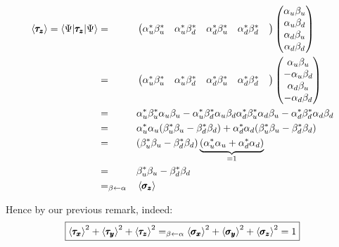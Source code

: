 \documentclass[solutions.tex]{subfiles}
\begin{document}
\begin{equation*}\begin{aligned}
	\left\langle \pmb{\tau_z} \right\rangle = \langle \Psi|\pmb{\tau_z}|\Psi\rangle
		&=&& \begin{pmatrix}
			\alpha_u^*\beta_u^* &
			\alpha_u^*\beta_d^* &
			\alpha_d^*\beta_u^* &
			\alpha_d^*\beta_d^* &
		\end{pmatrix}\begin{pmatrix}
			\alpha_u\beta_u \\
			\alpha_u\beta_d \\
			\alpha_d\beta_u \\
			\alpha_d\beta_d \\
		\end{pmatrix} \\
	~ &=&& \begin{pmatrix}
			\alpha_u^*\beta_u^* &
			\alpha_u^*\beta_d^* &
			\alpha_d^*\beta_u^* &
			\alpha_d^*\beta_d^* &
		\end{pmatrix}\begin{pmatrix}
			\alpha_u\beta_u \\
			-\alpha_u\beta_d \\
			\alpha_d\beta_u \\
			-\alpha_d\beta_d \\
		\end{pmatrix} \\
	~ &=&& \alpha_u^*\beta_u^*\alpha_u\beta_u
			-\alpha_u^*\beta_d^*\alpha_u\beta_d
			\alpha_d^*\beta_u^*\alpha_d\beta_u
			-\alpha_d^*\beta_d^*\alpha_d\beta_d  \\
	~ &=&& \alpha_u^*\alpha_u(
			\beta_u^*\beta_u - \beta_d^*\beta_d
		) + \alpha_d^*\alpha_d(
			\beta_u^*\beta_u - \beta_d^*\beta_d
		) \\
	~ &=&& (\beta_u^*\beta_u - \beta_d^*\beta_d)
		\underbrace{(\alpha_u^*\alpha_u+ \alpha_d^*\alpha_d)}_{=1} \\
	~ &=&& \beta_u^*\beta_u - \beta_d^*\beta_d \\
	~ &=_{\beta\leftarrow\alpha}&& \left\langle \pmb{\sigma_z} \right\rangle
\end{aligned}\end{equation*}

Hence by our previous remark, indeed:
\[
	\boxed{\left\langle \pmb{\tau_x} \right\rangle^2+\left\langle \pmb{\tau_y} \right\rangle^2+\left\langle \pmb{\tau_z} \right\rangle^2
		=_{\beta\leftarrow\alpha}
			\left\langle \pmb{\sigma_x} \right\rangle^2+\left\langle \pmb{\sigma_y} \right\rangle^2+\left\langle \pmb{\sigma_z} \right\rangle^2
		=1}
\]
\end{document}
